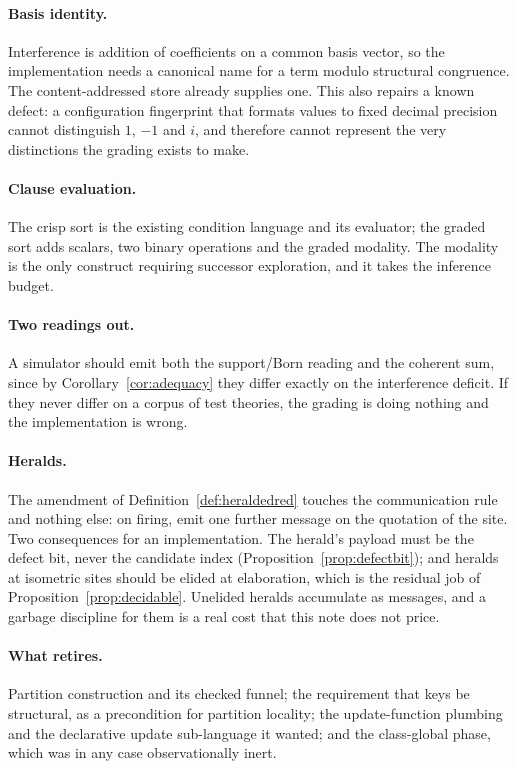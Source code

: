 \documentclass[11pt,a4paper]{article}
\theoremstyle{plain}
\theoremstyle{definition}
\theoremstyle{remark}
\begin{document}
\paragraph{Basis identity.} Interference is addition of coefficients on a common
basis vector, so the implementation needs a canonical name for a term modulo
structural congruence. The content-addressed store already supplies one. This
also repairs a known defect: a configuration fingerprint that formats values to
fixed decimal precision cannot distinguish $1$, $-1$ and $i$, and therefore
cannot represent the very distinctions the grading exists to make.

\paragraph{Clause evaluation.} The crisp sort is the existing condition language
and its evaluator; the graded sort adds scalars, two binary operations and the
graded modality. The modality is the only construct requiring successor
exploration, and it takes the inference budget.

\paragraph{Two readings out.} A simulator should emit both the support/Born
reading and the coherent sum, since by Corollary~\ref{cor:adequacy} they differ
exactly on the interference deficit. If they never differ on a corpus of test
theories, the grading is doing nothing and the implementation is wrong.

\paragraph{Heralds.} The amendment of Definition~\ref{def:heraldedred} touches
the communication rule and nothing else: on firing, emit one further message on
the quotation of the site. Two consequences for an implementation. The herald's
payload must be the defect bit, never the candidate index
(Proposition~\ref{prop:defectbit}); and heralds at isometric sites should be
elided at elaboration, which is the residual job of
Proposition~\ref{prop:decidable}. Unelided heralds accumulate as messages, and
a garbage discipline for them is a real cost that this note does not price.

\paragraph{What retires.} Partition construction and its checked funnel; the
requirement that keys be structural, as a precondition for partition locality;
the update-function plumbing and the declarative update sub-language it wanted;
and the class-global phase, which was in any case observationally inert.
\end{document}
